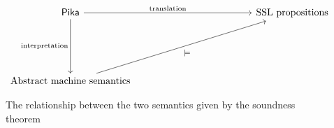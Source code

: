 \begin{figure}
\[\begin{tikzcd}
	{\textnormal{\tool}} &&&&& {\textnormal{SSL propositions}} \\
	\\
	\\
	{\textnormal{Abstract machine semantics}}
	\arrow["{\textnormal{translation}}", from=1-1, to=1-6]
	\arrow["{\textnormal{interpretation}}"', from=1-1, to=4-1]
	\arrow["\models"', from=4-1, to=1-6]
\end{tikzcd}\]
  \caption{The relationship between the two \tool{} semantics given by the soundness theorem}
  \label{fig:soundness-diagram}
\end{figure}
